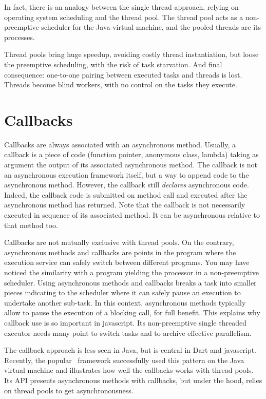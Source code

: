 In fact, there is an analogy between the single thread approach, relying on operating system scheduling and the thread pool. The thread pool acts as a non-preemptive scheduler for the Java virtual machine, and the pooled threads are its processes.

Thread pools bring huge speedup, avoiding costly thread instantiation, but loose the preemptive scheduling, with the risk of task starvation.
And final consequence: one-to-one pairing between executed tasks and threads is lost. Threads become blind workers, with no control on the tasks they execute.

\section{Callbacks}

Callbacks are always associated with an asynchronous method. Usually, a callback is a piece of code (function pointer, anonymous class, lambda) taking as argument the output of its associated asynchronous method. The callback is not an asynchronous execution framework itself, but a way to append code to the asynchronous method. However, the callback still \emph{declares} asynchronous code. Indeed, the callback code is submitted on method call and executed after the asynchronous method has returned. Note that the callback is not necessarily executed in sequence of its associated method. It can be asynchronous relative to that method too.

Callbacks are not mutually exclusive with thread pools. On the contrary, asynchronous methods and callbacks are points in the program where the execution service can safely switch between different programs. You may have noticed the similarity with a program yielding the processor in a non-preemptive scheduler. Using asynchronous methods and callbacks breaks a task into smaller pieces indicating to the scheduler where it can safely pause an execution to undertake another sub-task. In this context, asynchronous methods typically allow to pause the execution of a blocking call, for full benefit. This explains why callback use is so important in javascript. Its non-preemptive single threaded executor needs many point to switch tasks and to archive effective parallelism.

The callback approach is less seen in Java, but is central in Dart and javascript. Recently, the popular \vertx\ framework successfully used this pattern on the Java virtual machine and illustrates how well the callbacks works with thread pools. Its API presents asynchronous methods with callbacks, but under the hood, relies on thread pools to get asynchronousness.

